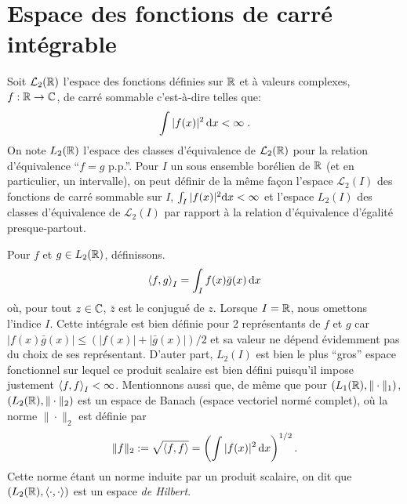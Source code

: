\section{Espace des fonctions de carr{\'e} int{\'e}grable}
Soit $\mathcal{L}_2(\mathbb{R})$ l'espace des fonctions d{\'e}finies sur $\mathbb{R}$ et
{\`a} valeurs complexes, $f:\mathbb{R}\rightarrow \mathbb{C}$, de carr{\'e} sommable
c'est-{\`a}-dire telles que:
$$
\int |f(x)|^2\,\mathrm{d} x<\infty \;.
$$
On note $L_2(\mathbb{R})$ l'espace des classes d'{\'e}quivalence de
$\mathcal{L}_2(\mathbb{R})$ pour la relation d'{\'e}quivalence ``$f=g$ p.p.''.
Pour $I$ un sous ensemble bor{\'e}lien de $\mathbb{R}$ (et en particulier, un intervalle), on peut d{\'e}finir
de la m{\^e}me fa\c{c}on l'espace $\mathcal{L}_2(I)$ des fonctions  de carr{\'e} sommable sur $I$, $\int_I |f(x)|^2 \mathrm{d} x < \infty$
et l'espace $L_2(I)$ des classes d'{\'e}quivalence de $\mathcal{L}_2(I)$ par rapport {\`a} la relation d'{\'e}quivalence d'{\'e}galit{\'e} presque-partout.


Pour $f$ et $g \in L_2(\mathbb{R})$, d{\'e}finissons.
\begin{equation}
\label{eq:definitionpscal}
\left\langle f, g \right\rangle_I =\int_I f(x) \bar{g}(x)\,\mathrm{d} x
\end{equation}
o{\`u}, pour tout $z \in \mathbb{C}$, $\bar{z}$ est le conjugu{\'e} de $z$. Lorsque $I= \mathbb{R}$, nous omettons  l'indice $I$.
Cette int{\'e}grale est bien d{\'e}finie pour 2 repr{\'e}sentants de $f$ et $g$ car $|f(x) \bar{g}(x)|\leq (|f(x)|+ |\bar{g}(x)|)/2$ et
sa valeur ne d{\'e}pend {\'e}videmment pas du choix de ses repr{\'e}sentant. D'auter part, $L_2(I)$ est bien le plus ``gros'' espace
fonctionnel sur lequel ce produit scalaire est bien d{\'e}fini puisqu'il impose justement $\left\langle f, f \right\rangle_I<\infty$.
Mentionnons aussi que, de m\^eme que pour $(L_1(\mathbb{R}),\|\cdot\|_1)$,  $(L_2(\mathbb{R}),\|\cdot\|_2)$ est un espace de Banach
(espace vectoriel norm{\'e} complet), o{\`u} la norme $\|\cdot\|_2$ est d{\'e}finie par
$$
\|f\|_2:=\sqrt{\left\langle f, f \right\rangle}=\left(\int |f(x)|^2\,\mathrm{d} x\right)^{1/2}.
$$
Cette norme {\'e}tant un norme induite par un produit scalaire, on dit que
$(L_2(\mathbb{R}),\left\langle \cdot, \cdot \right\rangle)$ est un espace
\textit{de Hilbert}.

